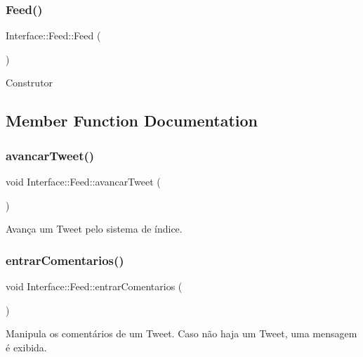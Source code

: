\subsubsection{\texorpdfstring{Feed()}{Feed()}}
{\footnotesize\ttfamily Interface\+::\+Feed\+::\+Feed (\begin{DoxyParamCaption}{ }\end{DoxyParamCaption})}

Construtor 

\subsection{Member Function Documentation}
\mbox{\label{class_interface_1_1_feed_a2203568fb299f7ea19040e9770eb16a3}} 
\subsubsection{\texorpdfstring{avancar\+Tweet()}{avancarTweet()}}
{\footnotesize\ttfamily void Interface\+::\+Feed\+::avancar\+Tweet (\begin{DoxyParamCaption}{ }\end{DoxyParamCaption})\hspace{0.3cm}{\ttfamily [private]}}



Avança um Tweet pelo sistema de índice. 

\mbox{\label{class_interface_1_1_feed_a9367d3031cdd3a36818eff4d1f49b92c}} 
\subsubsection{\texorpdfstring{entrar\+Comentarios()}{entrarComentarios()}}
{\footnotesize\ttfamily void Interface\+::\+Feed\+::entrar\+Comentarios (\begin{DoxyParamCaption}{ }\end{DoxyParamCaption})\hspace{0.3cm}{\ttfamily [private]}}



Manipula os comentários de um Tweet. Caso não haja um Tweet, uma mensagem é exibida. 

